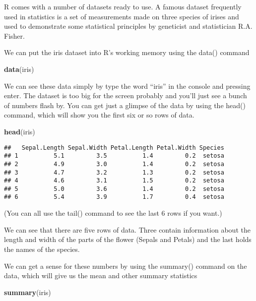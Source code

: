 \documentclass[]{book}
\newenvironment{Shaded}{\begin{snugshade}}{\end{snugshade}}
\newcommand{\KeywordTok}[1]{\textcolor[rgb]{0.13,0.29,0.53}{\textbf{#1}}}
\newcommand{\NormalTok}[1]{#1}
\theoremstyle{definition}
\theoremstyle{definition}
\theoremstyle{definition}
\theoremstyle{remark}
\begin{document}
R comes with a number of datasets ready to use. A famous dataset
frequently used in statistics is a set of measurements made on three
species of irises and used to demonstrate some statistical principles by
geneticist and statistician R.A. Fisher.

We can put the iris dataset into R's working memory using the data()
command

\begin{Shaded}
\begin{Highlighting}[]
\KeywordTok{data}\NormalTok{(iris)}
\end{Highlighting}
\end{Shaded}

We can see these data simply by type the word ``iris'' in the console
and pressing enter. The dataset is too big for the screen probably and
you'll just see a bunch of numbers flash by. You can get just a glimpse
of the data by using the head() command, which will show you the first
six or so rows of data.

\begin{Shaded}
\begin{Highlighting}[]
\KeywordTok{head}\NormalTok{(iris)}
\end{Highlighting}
\end{Shaded}

\begin{verbatim}
##   Sepal.Length Sepal.Width Petal.Length Petal.Width Species
## 1          5.1         3.5          1.4         0.2  setosa
## 2          4.9         3.0          1.4         0.2  setosa
## 3          4.7         3.2          1.3         0.2  setosa
## 4          4.6         3.1          1.5         0.2  setosa
## 5          5.0         3.6          1.4         0.2  setosa
## 6          5.4         3.9          1.7         0.4  setosa
\end{verbatim}

(You can all use the tail() command to see the last 6 rows if you want.)

We can see that there are five rows of data. Three contain information
about the length and width of the parts of the flower (Sepals and
Petals) and the last holds the names of the species.

We can get a sense for these numbers by using the summary() command on
the data, which will give us the mean and other summary statistics

\begin{Shaded}
\begin{Highlighting}[]
\KeywordTok{summary}\NormalTok{(iris)}
\end{Highlighting}
\end{Shaded}
\end{document}
